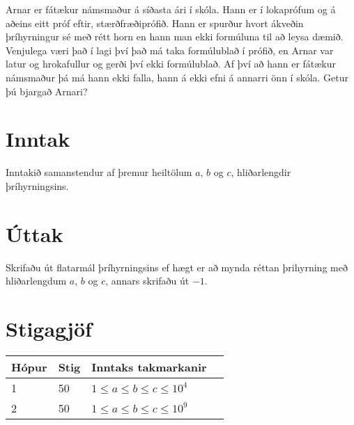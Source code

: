Arnar er fátækur námsmaður á síðasta ári í skóla. Hann er í lokaprófum og á aðeins eitt próf eftir, stærðfræðiprófið.
Hann er spurður hvort ákveðin þríhyrningur sé með rétt horn en hann man ekki formúluna til að leysa dæmið.
Venjulega væri það í lagi því það má taka formúlublað í prófið, en Arnar var latur og hrokafullur og gerði því ekki formúlublað.
Af því að hann er fátækur námsmaður þá má hann ekki falla, hann á ekki efni á annarri önn í skóla. Getur þú bjargað Arnari?

\section*{Inntak}
Inntakið samanstendur af þremur heiltölum $a$, $b$ og $c$, hliðarlengdir þríhyrningsins.

\section*{Úttak}
Skrifaðu út flatarmál þríhyrningsins ef hægt er að mynda réttan þrihyrning með hliðarlengdum $a$, $b$ og $c$, annars skrifaðu út $-1$.

\section*{Stigagjöf}
\begin{tabular}{|l|l|l|l|}
\hline
Hópur & Stig & Inntaks takmarkanir \\ \hline
1     & 50  & $1 \leq a \leq b \leq c \leq 10^4$ \\ \hline
2     & 50  & $1 \leq a \leq b \leq c \leq 10^9$ \\ \hline
\end{tabular}
